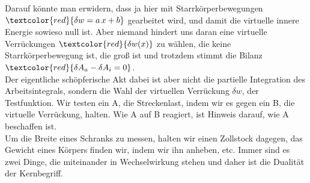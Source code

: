 Darauf k\"{o}nnte man erwidern, dass ja hier mit Starrk\"{o}rperbewegungen $\textcolor{red}{\delta w = a\,x + b}$ gearbeitet wird, und damit die virtuelle innere Energie sowieso null ist. Aber niemand hindert uns daran eine virtuelle Verr\"{u}ckungen $\textcolor{red}{\delta w(x)} $ zu w\"{a}hlen, die keine Starrk\"{o}rperbewegung ist, die gro{\ss} ist und trotzdem stimmt die Bilanz $\textcolor{red}{\delta A_a - \delta A_i = 0}$.
\\
Der eigentliche sch\"{o}pferische Akt dabei ist aber nicht die partielle Integration des Arbeitsintegrals, sondern die Wahl  der virtuellen Verr\"{u}ckung $\delta w $,   der Testfunktion. Wir testen ein A, die Streckenlast, indem wir es gegen ein B, die virtuelle Verr\"{u}ckung, halten. Wie A auf B reagiert, ist Hinweis darauf, wie A beschaffen ist.
\\


Um die Breite eines Schranks zu messen, halten wir einen Zollstock dagegen, das Gewicht eines K\"{o}rpers finden wir, indem wir ihn anheben, etc. Immer sind es zwei Dinge, die miteinander in Wechselwirkung stehen und daher ist die Dualit\"{a}t der Kernbegriff.\\

